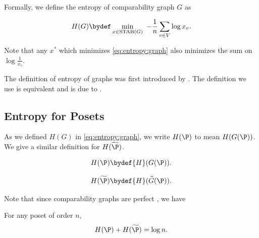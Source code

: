 Formally, we define the entropy of comparability graph $G$ as
\begin{definition}
\begin{equation}
{H}(G) \bydef \min_{x \in \operatorname{STAB}(G)}~ -\frac{1}{n} \sum_{v \in
V} \log x_v.
\label{eq:entropy:graph}
\end{equation}
\end{definition}

Note that any $x^*$ which minimizes \ref{eq:entropy:graph} also minimizes the
sum on $\log \frac{1}{x_v}$.

The definition of entropy of graphs was first introduced by
\citet*{korner1973coding}. The definition we use is equivalent and is due to
\citet*{csiszar:1990}.


\subsection{Entropy for Posets}

As we defined $H(G)$ in \ref{eq:entropy:graph}, we write $H(\P)$ to mean
$H(G(\P))$. We give a similar definition for \(H(\widetilde{\P})\).
\begin{definition}
\begin{displaymath}
{H}(\P) \bydef {H}({G}(\P)).
\end{displaymath}
\end{definition}
\begin{definition}
\begin{displaymath}
{H}(\widetilde{\P}) \bydef {H}(\widetilde{G}(\P)).
\end{displaymath}
\end{definition}

Note that since comparability graphs are perfect \cite{berge:1984}, we have
\begin{theorem}
For any poset of order \(n\),
\begin{displaymath}
H(\P) + H(\widetilde{\P}) = \log n.
\end{displaymath}
\end{theorem}
